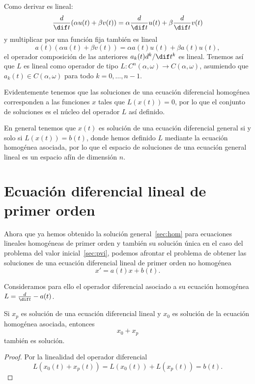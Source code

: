 \documentclass[../ecuaciones_diferenciales.tex]{subfiles}
\begin{document}
Como derivar es lineal:
\[\frac{d}{\dif t} (\alpha u(t) + \beta v(t))
	= \alpha \frac{d}{\dif t} u(t) + \beta \frac{d}{\dif t} v(t)\]
y multiplicar por una función fija también es lineal
\[a(t)(\alpha u(t) + \beta v(t)) = \alpha a(t) u(t) + \beta a(t) u(t),\]
el operador composición de las anteriores \(a_k(t) d^k/\dif t^k\) es
lineal. Tenemos así que \(L\) es lineal como operador de tipo
\(L : C^n(\alpha, \omega) \to C(\alpha, \omega)\), asumiendo que
\(a_k(t) \in C(\alpha, \omega)\) para todo \(k=0, \dots, n-1\).

\begin{remark}
	Evidentemente tenemos que las soluciones de una ecuación diferencial homogénea
	corresponden a las funciones \(x\) tales que \(L(x(t)) = 0\), por lo que el
	conjunto de soluciones es el núcleo del operador \(L\) así definido.
\end{remark}

\begin{remark}
	En general tenemos que \(x(t)\) es solución de una ecuación diferencial
	general si y solo si \(L(x(t)) = b(t)\), donde hemos definido \(L\)
	mediante la ecuación homogénea asociada, por lo que el espacio de
	soluciones de una ecuación general lineal es un espacio afín de dimensión
	\(n\).
\end{remark}

\section{Ecuación diferencial lineal de primer orden}

Ahora que ya hemos obtenido la solución general~\autoref{sec:hom} para
ecuaciones lineales homogéneas de primer orden y también su solución única en el
caso del problema del valor inicial~\autoref{sec:pvi}, podemos afrontar el
problema de obtener las soluciones de una ecuación diferencial lineal de primer
orden no homogénea
\[x' = a(t)x + b(t).\]

Consideramos para ello el operador diferencial asociado a su ecuación homogénea
\(L = \frac{d}{\dif t} - a(t)\).

\begin{lemma}
	Si \(x_p\) es solución de una ecuación diferencial lineal y \(x_0\) es
	solución de la ecuación homogénea asociada, entonces \[x_0 + x_p\] también es
	solución.
\end{lemma}

\begin{proof}
	Por la linealidad del operador diferencial
	\[L(x_0(t) + x_p(t)) = L(x_0(t)) + L(x_p(t)) = b(t).\]
\end{proof}
\end{document}
